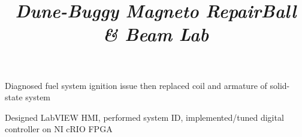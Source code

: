 \documentclass[mm]{res}
\begin{document}
\begin{resume}




\title{\textsl{Dune-Buggy Magneto Repair}}
\begin{position}
\tb Diagnosed fuel system ignition issue then replaced coil and armature of solid-state system
\end{position}

\title{\textsl{Ball \& Beam Lab}}
\begin{position}
\tb Designed LabVIEW HMI, performed system ID, implemented/tuned digital controller on NI cRIO FPGA
\end{position}




\end{resume}
\end{document}
